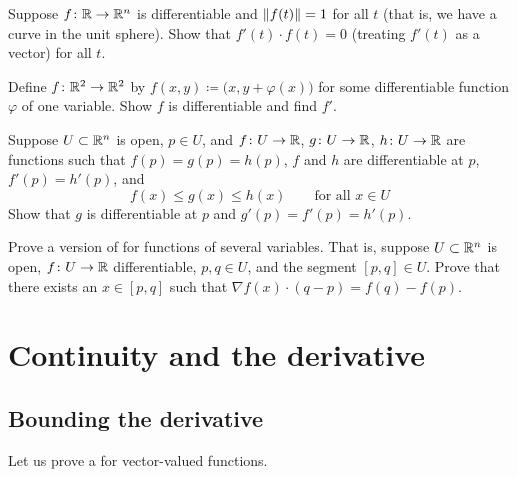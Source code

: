 \begin{exercise}
Suppose $f \colon {\mathbb{R}} \to {\mathbb{R}}^n$ is differentiable and $\lVert {f(t)} \rVert = 1$ for
all $t$ (that is, we have a curve in the unit sphere).  Show that 
$f'(t) \cdot f(t) = 0$ (treating $f'(t)$ as a vector) for all $t$.
\end{exercise}

\begin{exercise}
Define $f \colon {\mathbb{R}}^2 \to {\mathbb{R}}^2$ by $f(x,y) \coloneqq
\bigl(x,y+\varphi(x)\bigr)$ for some differentiable function $\varphi$ of one
variable.  Show $f$ is differentiable and find $f'$.
\end{exercise}

\begin{exercise}
Suppose $U \subset {\mathbb{R}}^n$ is open, $p \in U$, and
$f \colon U \to {\mathbb{R}}$,
$g \colon U \to {\mathbb{R}}$,
$h \colon U \to {\mathbb{R}}$ are functions such that
$f(p) = g(p) = h(p)$, $f$ and $h$ are differentiable at $p$,
$f'(p) = h'(p)$, and
\begin{equation*}
f(x) \leq g(x) \leq h(x) \qquad \text{for all } x \in U
\end{equation*}
Show that $g$ is differentiable at $p$ and 
$g'(p) = f'(p) = h'(p)$.
\end{exercise}

\begin{exercise}
Prove a version of \emph{}
for functions of several variables.  That is, suppose $U \subset {\mathbb{R}}^n$
is open, $f \colon U \to {\mathbb{R}}$ differentiable, $p,q \in U$, and the segment
$[p,q] \in U$.  Prove that there exists an $x \in [p,q]$ such that
$\nabla f (x) \cdot (q-p) = f(q)-f(p)$.
\end{exercise}


\sectionnewpage
\section{Continuity and the derivative}
\label{sec:svthedercont}



\subsection{Bounding the derivative}

Let us prove a  for vector-valued functions.

